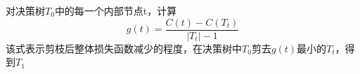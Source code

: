 \documentclass[UTF8]{ctexart} %
\begin{document}
			对决策树$T_0$中的每一个内部节点t，计算\[g(t)=\frac{C(t)-C(T_t)}{|T_t|-1}\]
			该式表示剪枝后整体损失函数减少的程度，在决策树中$T_0$剪去$g(t)$最小的$T_t$，得到$T_1$
			\begin{figure}[H]
			\end{figure}
			
			
			
		
\end{document}
